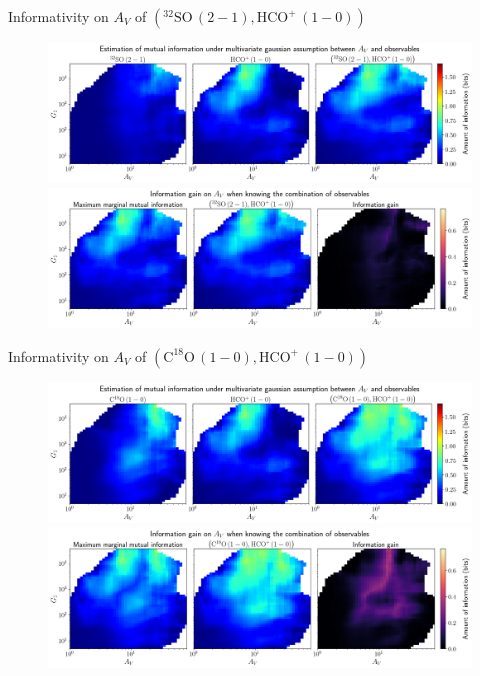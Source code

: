 \documentclass{beamer}
\begin{document}
\begin{frame}{Informativity on $A_V$ of $\left(\mathrm{^{32}SO\,(2-1)},\mathrm{HCO^+\,(1-0)}\right)$}
    \begin{figure}
        \centering
        \includegraphics[width=0.95\linewidth]{../linearinfogauss/av__32so21_hcop10_linearinfogauss.png}
        \vfill
        \includegraphics[width=0.95\linewidth]{../linearinfogauss/av__32so21_hcop10_linearinfogauss_gain.png}
    \end{figure}
\end{frame}

\begin{frame}{Informativity on $A_V$ of $\left(\mathrm{C^{18}O\,(1-0)},\mathrm{HCO^+\,(1-0)}\right)$}
    \begin{figure}
        \centering
        \includegraphics[width=0.95\linewidth]{../linearinfogauss/av__c18o10_hcop10_linearinfogauss.png}
        \vfill
        \includegraphics[width=0.95\linewidth]{../linearinfogauss/av__c18o10_hcop10_linearinfogauss_gain.png}
    \end{figure}
\end{frame}
\end{document}
